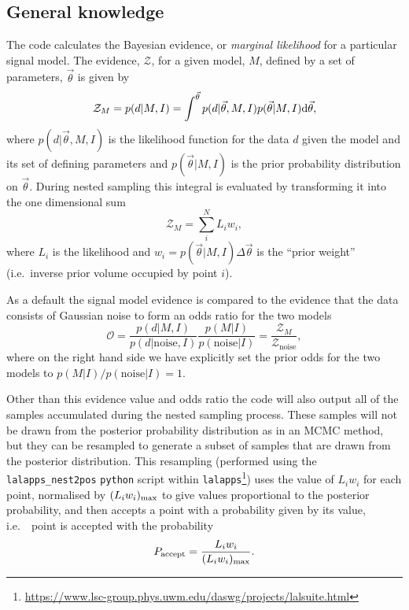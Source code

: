 \subsection{General knowledge}

The code calculates the Bayesian evidence, or {\it marginal likelihood} for a particular signal model. The
evidence, $\mathcal{Z}$, for a given model, $M$, defined by a set of parameters, $\vec{\theta}$ is given by
\begin{equation}\label{eq:evidence}
\mathcal{Z}_M = p(d|M,I) = \int^{\vec{\theta}} p(d|\vec{\theta},M,I)p(\vec{\theta}|M,I) {\rm d}\vec{\theta},
\end{equation}
where $p(d|\vec{\theta},M,I)$ is the likelihood function for the data $d$ given the
model and its set of defining parameters and $p(\vec{\theta}|M,I)$ is the prior probability distribution on
$\vec{\theta}$. During nested sampling this integral is evaluated by transforming it into the one dimensional
sum
\begin{equation}\label{eq:nestedsampev}
\mathcal{Z}_M = \sum_i^N L_i w_i,
\end{equation}
where $L_i$ is the likelihood and $w_i = p(\vec{\theta}|M,I) \Delta\vec{\theta}$ is the ``prior weight''
(i.e.\ inverse prior volume occupied by point $i$).

As a default the signal model evidence is compared to the
evidence that the data consists of Gaussian noise to form an odds ratio for the two models
\begin{equation}\label{eq:oddsratio}
\mathcal{O} = \frac{p(d|M,I)}{p(d|\text{noise},I)}\frac{p(M|I)}{p(\text{noise}|I)} =
\frac{\mathcal{Z}_M}{\mathcal{Z}_{\text{noise}}},
\end{equation}
where on the right hand side we have explicitly set the prior odds for the two models to
$p(M|I)/p(\text{noise}|I) = 1$.

Other than this evidence value and odds ratio the code will also output all of the samples accumulated during
the nested sampling process. These samples will not be drawn from the posterior probability distribution as in
an MCMC method, but they can be resampled to generate a subset of samples that are drawn from the posterior
distribution. This resampling (performed using the {\tt lalapps\_nest2pos} {\tt python} script within
{\tt lalapps}\footnote{\url{https://www.lsc-group.phys.uwm.edu/daswg/projects/lalsuite.html}}) uses the
value of $L_i w_i$ for each point, normalised by $(L_iw_i)_{\rm max}$ to give values proportional to the
posterior probability, and then accepts a point with a probability given by its value, i.e.\ \ point is
accepted with the probability
\begin{equation}
P_{\text{accept}} = \frac{L_i w_i}{(L_iw_i)_{\rm max}}.
\end{equation}


